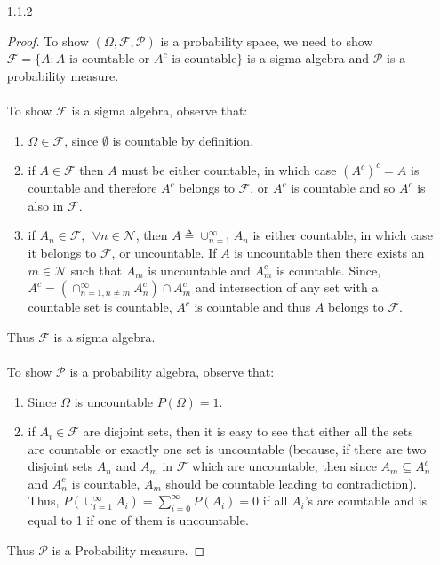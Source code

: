 \documentclass[a4paper,english,10pt]{article}
\begin{document}
\begin{enumerate}
\begin{proof}
\end{proof}


\item[1.1.2 ]
\begin{proof}
To show $(\Omega, \mathcal{F}, \mathcal{P})$ is a probability space, we need to show $\mathcal{F} = \lbrace{A: A \text{ is countable or } A^c \text{ is countable}\rbrace}$ is a sigma algebra and $\mathcal{P}$ is a probability measure.\\\\
To show $\mathcal{F}$ is a sigma algebra, observe that:
\begin{enumerate}
\item
$\Omega \in \mathcal{F}$, since $\emptyset$ is countable by definition.
\item
if $A\in \mathcal{F}$ then $A$ must be either countable, in which case $(A^c)^c = A$ is countable and therefore $A^c$ belongs to $\mathcal{F}$, or $A^c$ is countable and so $A^c$ is also in $\mathcal{F}$.
\item
if $A_n \in \mathcal{F}, ~~\forall n \in \mathcal{N}$, then $A \triangleq \cup_{n=1}^\infty A_n$ is either countable, in which case it belongs to $\mathcal{F}$, or uncountable. If $A$ is uncountable then there exists an $m\in \mathcal{N}$ such that $A_m$ is uncountable and $A_m^c$ is countable. Since,  $A^c = (\cap_{n=1,n\neq m}^\infty A_n^c) \cap A_m^c$ and intersection of any set with a countable set is countable, $A^c$ is countable and thus $A$ belongs to $\mathcal{F}$.
\end{enumerate}
Thus $\mathcal{F}$ is a sigma algebra.\\\\
To show $\mathcal{P}$ is a probability algebra, observe that:
\begin{enumerate}
\item
Since $\Omega$ is uncountable $P(\Omega) = 1$.
\item
if $A_i \in \mathcal{F}$ are disjoint sets, then it is easy to see that either all the sets are countable or exactly one set is uncountable (because, if there are two disjoint sets $A_n$ and $A_m$ in $\mathcal{F}$ which are uncountable, then since $A_m \subseteq A_n^c$ and $A_n^c$ is countable, $A_m$ should be countable leading to contradiction). Thus, $P(\cup_{i=1}^\infty A_i) = \sum_{i=0}^{\infty} P(A_i) = 0$ if all $A_i$'s are countable and is equal to 1 if one of them is uncountable.
\end{enumerate}
Thus $\mathcal{P}$ is a Probability measure. 
\end{proof}


\end{enumerate}
\end{document}
